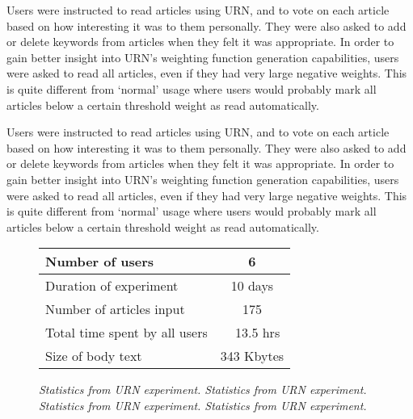 








Users were instructed to read articles using URN, and to vote on each article
based on how interesting it was to them personally. They were also asked to add
or delete keywords from articles when they felt it was appropriate. In order to
gain better insight into URN's weighting function generation capabilities,
users were asked to read all articles, even if they had very large negative
weights. This is quite different from `normal' usage where users
would probably mark all articles below a certain threshold weight as read
automatically.

Users were instructed to read articles using URN, and to vote on each article
based on how interesting it was to them personally. They were also asked to add
or delete keywords from articles when they felt it was appropriate. In order to
gain better insight into URN's weighting function generation capabilities,
users were asked to read all articles, even if they had very large negative
weights. This is quite different from `normal' usage where users
would probably mark all articles below a certain threshold weight as read
automatically.


\begin{figure}[htb]
  \begin{center}
  \small
  \begin{tabular} {|l|c|} \hline
    Number of users & 6 \\ \hline
    Duration of experiment & 10 days \\ \hline
    Number of articles input & 175 \\ \hline
    Total time spent by all users & ~ 13.5 hrs \\ \hline
    Size of body text & 343 Kbytes \\ \hline
  \end{tabular}
  \caption{ {\em Statistics from URN experiment. Statistics from
  URN experiment. Statistics from URN experiment. Statistics from URN
  experiment.}}
  \label{tab:general-stat}
  \normalsize
  \end{center}
\end{figure}


